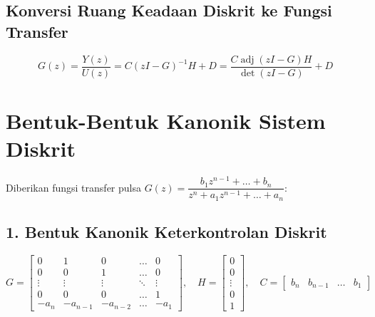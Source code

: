 \documentclass[11pt,a4paper]{article}
\begin{document}
\subsection{Konversi Ruang Keadaan Diskrit ke Fungsi Transfer}
\begin{equation*}
    G(z) = \frac{Y(z)}{U(z)} = C (zI - G)^{-1} H + D = \frac{C \operatorname{adj}(zI - G) H}{\det(zI - G)} + D
\end{equation*}

\vspace{6pt}

\section{Bentuk-Bentuk Kanonik Sistem Diskrit}

Diberikan fungsi transfer pulsa $G(z) = \dfrac{b_1 z^{n-1} + \dots + b_n}{z^n + a_1 z^{n-1} + \dots + a_n}$:

\subsection{1. Bentuk Kanonik Keterkontrolan Diskrit}
\begin{equation*}
    G = \begin{bmatrix}
        0 & 1 & 0 & \dots & 0 \\
        0 & 0 & 1 & \dots & 0 \\
        \vdots & \vdots & \vdots & \ddots & \vdots \\
        0 & 0 & 0 & \dots & 1 \\
        -a_n & -a_{n-1} & -a_{n-2} & \dots & -a_1
    \end{bmatrix}, \quad
    H = \begin{bmatrix} 0 \\ 0 \\ \vdots \\ 0 \\ 1 \end{bmatrix}, \quad
    C = \begin{bmatrix} b_n & b_{n-1} & \dots & b_1 \end{bmatrix}
\end{equation*}
\end{document}
